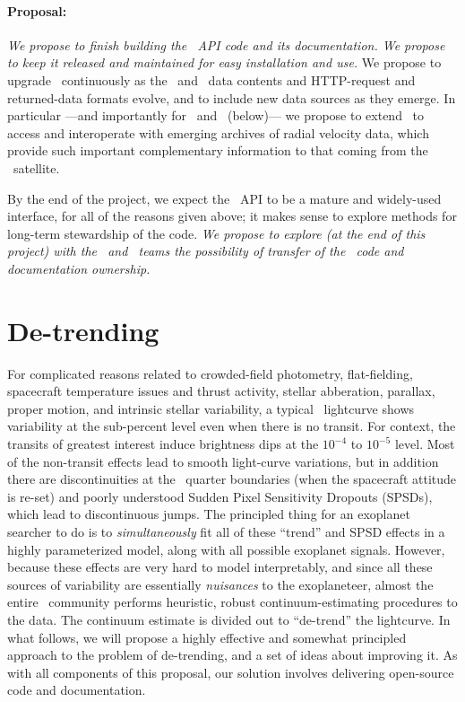 \documentclass[letterpaper,12pt,preprint]{hack_aastex}
\newcommand{\kplr}{\package{kplr}}
\newcommand{\Bart}{\package{Bart}}
\newcommand{\TheCreator}{\package{TheCreator}}
\begin{document}
\paragraph{Proposal:}
\emph{We propose to finish building the \kplr\ API code and its documentation.
We propose to keep it released and maintained for easy installation and use.}
We propose to upgrade \kplr\ continuously as the \MAST\ and \EA\ data contents and
HTTP-request and returned-data formats evolve,
and to include new data sources as they emerge.
In particular%
---and importantly for \Bart\ and \TheCreator\ (below)---%
we propose to extend \kplr\ to access and interoperate with
emerging archives of radial velocity data,
which provide such important complementary information to that coming from
the \Kepler\ satellite.

By the end of the project,
we expect the \kplr\ API to be a mature and widely-used interface,
for all of the reasons given above;
it makes sense to explore methods for long-term stewardship of the code.
\emph{We propose to explore (at the end of this project) with the \MAST\ and \EA\ teams the possibility of
transfer of the \kplr\ code and documentation ownership.}


\section{De-trending}

For complicated reasons related to crowded-field photometry, flat-fielding,
spacecraft temperature issues and thrust activity, stellar abberation, parallax, proper motion,
and intrinsic stellar variability, a typical \Kepler\ lightcurve shows
variability at the sub-percent level even when there is no transit.
For context, the transits of greatest interest induce brightness dips at the
$10^{-4}$ to $10^{-5}$ level.
Most of the non-transit effects lead to smooth light-curve variations, but in addition
there are discontinuities at the \Kepler\ quarter boundaries (when the
spacecraft attitude is re-set) and poorly understood Sudden Pixel
Sensitivity Dropouts (SPSDs), which lead to discontinuous jumps.
The principled thing for an exoplanet searcher to do is to \emph{simultaneously}
fit all of these ``trend'' and SPSD effects in a highly parameterized model,
along with all possible exoplanet signals.
However, because these effects are very hard to model interpretably, and since
all these sources of variability are essentially \emph{nuisances} to the
exoplaneteer, almost the entire \Kepler\ community performs heuristic, robust
continuum-estimating procedures to the data.
The continuum estimate is divided out to ``de-trend'' the lightcurve.
In what follows, we will propose a highly effective and somewhat principled
approach to the problem of de-trending, and a set of ideas about improving it.
As with all components of this proposal, our solution involves delivering
open-source code and documentation.
\end{document}
